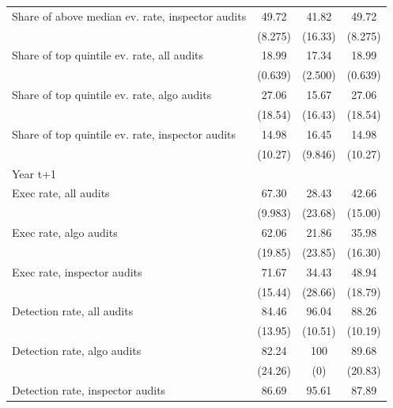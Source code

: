 {\begin{tabular}{l*{3}{c}}
Share of above median ev. rate, inspector audits&       49.72         &       41.82         &       49.72         \\
            &     (8.275)         &     (16.33)         &     (8.275)         \\
Share of top quintile ev. rate, all audits&       18.99         &       17.34         &       18.99         \\
            &     (0.639)         &     (2.500)         &     (0.639)         \\
Share of top quintile ev. rate, algo audits&       27.06         &       15.67         &       27.06         \\
            &     (18.54)         &     (16.43)         &     (18.54)         \\
Share of top quintile ev. rate, inspector audits&       14.98         &       16.45         &       14.98         \\
            &     (10.27)         &     (9.846)         &     (10.27)         \\
Year t+1    &                     &                     &                     \\
Exec rate, all audits&       67.30         &       28.43         &       42.66         \\
            &     (9.983)         &     (23.68)         &     (15.00)         \\
Exec rate, algo audits&       62.06         &       21.86         &       35.98         \\
            &     (19.85)         &     (23.85)         &     (16.30)         \\
Exec rate, inspector audits&       71.67         &       34.43         &       48.94         \\
            &     (15.44)         &     (28.66)         &     (18.79)         \\
Detection rate, all audits&       84.46         &       96.04         &       88.26         \\
            &     (13.95)         &     (10.51)         &     (10.19)         \\
Detection rate, algo audits&       82.24         &         100         &       89.68         \\
            &     (24.26)         &         (0)         &     (20.83)         \\
Detection rate, inspector audits&       86.69         &       95.61         &       87.89         \\

\end{tabular}}

